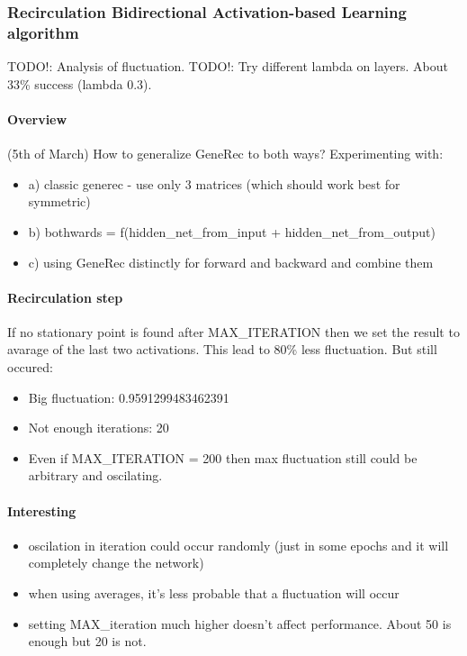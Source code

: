 
\subsubsection{Recirculation Bidirectional Activation-based Learning algorithm} 
TODO!: Analysis of fluctuation. 
TODO!: Try different lambda on layers. 
About 33\% success (lambda 0.3). 

\paragraph{Overview} 
(5th of March) 
How to generalize GeneRec to both ways? 
Experimenting with:
\begin{itemize} 
\item  a) classic generec - use only 3 matrices (which should work best for symmetric) 
\item  b) bothwards = f(hidden\_net\_from\_input + hidden\_net\_from\_output) 
\item  c) using GeneRec distinctly for forward and backward and combine them 
\end{itemize} 

\paragraph{Recirculation step} 
If no stationary point is found after MAX\_ITERATION then we set the result to avarage of the last two activations. This lead to 80\% less fluctuation. But still occured: 
\begin{itemize}
\item Big fluctuation: 0.9591299483462391
\item Not enough iterations: 20
\item Even if MAX\_ITERATION = 200 then max fluctuation still could be arbitrary and oscilating.
\end{itemize} 

\paragraph{Interesting} 
\begin{itemize} 
  \item oscilation in iteration could occur randomly (just in some epochs and it will completely change the network) 
  \item when using averages, it's less probable that a fluctuation will occur 
  \item setting MAX\_iteration much higher doesn't affect performance. About 50 is enough but 20 is not. 
\end{itemize} 
  
